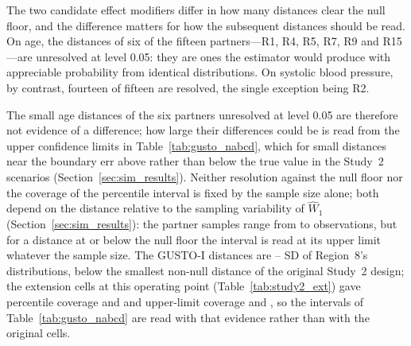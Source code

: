 \documentclass[AMA,Times1COL]{WileyNJDv5}
\begin{document}
The two candidate effect modifiers differ in how many distances clear the null floor, and the difference matters for how the subsequent distances should be read. On age, the distances of six of the fifteen partners---R1, R4, R5, R7, R9 and R15---are unresolved at level 0.05: they are ones the estimator would produce with appreciable probability from identical distributions. On systolic blood pressure, by contrast, fourteen of fifteen are resolved, the single exception being R2.


The small age distances of the six partners unresolved at level 0.05 are therefore not evidence of a difference; how large their differences could be is read from the upper confidence limits in Table~\ref{tab:gusto_nabcd}, which for small distances near the boundary err above rather than below the true value in the Study~2 scenarios (Section~\ref{sec:sim_results}). Neither resolution against the null floor nor the coverage of the percentile interval is fixed by the sample size alone; both depend on the distance relative to the sampling variability of $\widehat{W}_1$ (Section~\ref{sec:sim_results}): the partner samples range from  to  observations, but for a distance at or below the null floor the interval is read at its upper limit whatever the sample size. The GUSTO-I distances are -- SD of Region~8's distributions, below the smallest non-null distance of the original Study~2 design; the extension cells at this operating point (Table~\ref{tab:study2_ext}) gave percentile coverage  and  and upper-limit coverage  and , so the intervals of Table~\ref{tab:gusto_nabcd} are read with that evidence rather than with the original cells.
\end{document}
